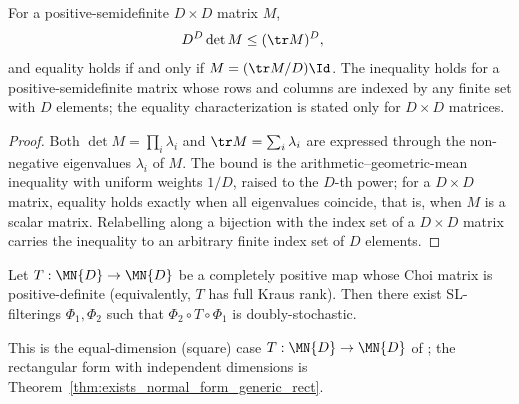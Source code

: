 \begin{lemma}
\label{lem:trace_det_amgm}
    \leanok
    For a positive-semidefinite $D \times D$ matrix $M$,
    \begin{align}
        D^{D}\det M
        &\leq(\tr M)^{D},
        \label{eq:representations_trace_det_amgm}
    \end{align}
    and equality holds if and only if $M=(\tr M/D)\Id$. The inequality holds
    for a positive-semidefinite matrix whose rows and columns are indexed by
    any finite set with $D$ elements; the equality characterization is stated
    only for $D \times D$ matrices.
\end{lemma}

\begin{proof}\leanok
    Both $\det M=\prod_{i}\lambda_{i}$ and
    $\tr M=\sum_{i}\lambda_{i}$ are expressed through the non-negative
    eigenvalues $\lambda_i$ of $M$. The bound is the
    arithmetic--geometric-mean inequality with uniform weights $1/D$, raised
    to the $D$-th power; for a $D \times D$ matrix, equality holds exactly
    when all eigenvalues coincide, that is, when $M$ is a scalar matrix.
    Relabelling along a bijection with the index set of a $D \times D$ matrix
    carries the inequality to an arbitrary finite index set of $D$ elements.
\end{proof}

\begin{theorem}\label{thm:exists_normal_form_generic}
    \leanok
    Let $T : \MN{D} \to \MN{D}$ be a completely positive map whose Choi matrix
    is positive-definite (equivalently, $T$ has full Kraus rank). Then there
    exist SL-filterings $\Phi_{1},\Phi_{2}$ such that
    $\Phi_{2}\circ T\circ\Phi_{1}$ is doubly-stochastic.

    This is the equal-dimension (square) case $T : \MN{D} \to \MN{D}$ of
    \cite[Proposition~2.9]{Wolf2012Quantum}; the rectangular form with
    independent dimensions is
    Theorem~\ref{thm:exists_normal_form_generic_rect}.
\end{theorem}

